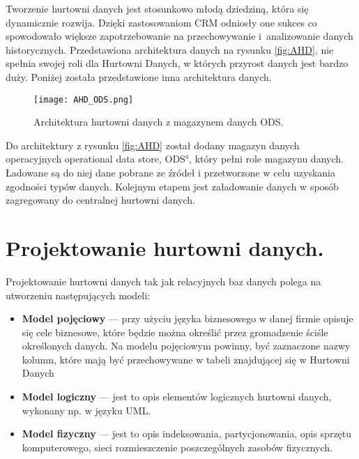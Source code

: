  
Tworzenie hurtowni danych jest stosunkowo młodą dziedziną, która się dynamicznie rozwija.
Dzięki zastosowaniom CRM odniosły one sukces co spowodowało większe zapotrzebowanie na przechowywanie
 i~analizowanie danych historycznych. Przedstawiona architektura danych na rysunku \ref{fig:AHD}, 
 nie spełnia swojej roli dla Hurtowni Danych, w których przyrost  danych jest bardzo duży.
Poniżej została przedstawione inna architektura danych.
\begin{center}
\begin{figure}[H]
  \begin{center}
    \texttt{[image: AHD\_ODS.png]}
  \end{center}
  \caption{Architektura hurtowni danych z magazynem danych ODS. }
    \label{fig:ODS}
\end{figure}
\end{center}

Do architektury z rysunku \ref{fig:AHD} został dodany magazyn danych operacyjnych \ang{operational data store, ODS}, który
pełni role magazynu danych. Ładowane są do niej dane pobrane ze źródeł i przetworzone w celu uzyskania zgodności typów danych.
Kolejnym etapem jest załadowanie danych w sposób zagregowany do centralnej hurtowni danych.


\section{Projektowanie hurtowni danych.}
Projektowanie hurtowni danych tak jak relacyjnych baz danych polega na utworzeniu następujących modeli:

\begin{itemize}
 \item \textbf{Model pojęciowy} --- 
    przy użyciu języka biznesowego w danej firmie opisuje się cele biznesowe, 
     które będzie można określić przez gromadzenie ściśle określonych danych.
    Na modelu pojęciowym powinny, być zaznaczone nazwy kolumn, które mają być przechowywane 
      w tabeli znajdującej się w Hurtowni Danych
 \item \textbf{Model logiczny} --- 
    jest to opis elementów  logicznych hurtowni danych, wykonany np. w języku UML.
 \item \textbf{Model fizyczny} --- 
    jest to opis indeksowania, partycjonowania, opis sprzętu komputerowego, sieci
     rozmieszczenie poszczególnych zasobów fizycznych.
\end{itemize}


